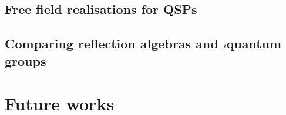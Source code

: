         \subsection{Free field realisations for QSPs}

        \subsection{\texorpdfstring{Comparing reflection algebras and $\imath$quantum groups}{}}

    \section{Future works}
    
    \printbibliography

